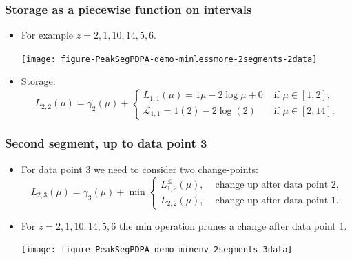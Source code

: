 \documentclass{beamer}
\begin{document}
\begin{frame}
  \frametitle{Storage as a piecewise function on intervals}
  \begin{itemize}
  \item For example $z = 2, 1, 10, 14, 5, 6$.
    \begin{center}
      \texttt{[image: figure-PeakSegPDPA-demo-minlessmore-2segments-2data]}
    \end{center}
  \item Storage: 
    \begin{equation*}
      L_{2,2}(\mu) = \gamma_2(\mu) + 
      \begin{cases}
        L_{1,1}(\mu) = 1\mu - 2\log \mu + 0 & \text{ if } \mu\in[1,2],\\
        \mathcal L_{1,1} = 1(2) - 2\log(2) & \text{ if } \mu\in[2,14].
      \end{cases}
    \end{equation*}
  \end{itemize}
\end{frame}

 
\begin{frame}[fragile]
  \frametitle{Second segment, up to data point 3}
  \begin{itemize}
  \item For data point 3 we need to consider two change-points:
    \begin{equation*}
      L_{2,3}(\mu) =  \gamma_3(\mu) + \min
      \begin{cases}
        L_{1,2}^{\leq}(\mu), & \text{ change up after data point 2},\\
        L_{2,2}(\mu), & \text{ change up after data point 1}. 
      \end{cases}
    \end{equation*}
  \item For $z = 2, 1, 10, 14, 5, 6$ the min operation prunes a
    change after data point 1.
    \begin{center}
      \texttt{[image: figure-PeakSegPDPA-demo-minenv-2segments-3data]}
    \end{center}
  \end{itemize}
\end{frame}
\end{document}
